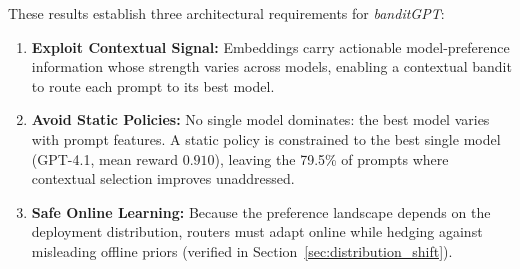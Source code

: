 

These results establish three architectural requirements for \textit{banditGPT}:
\begin{enumerate}[noitemsep,topsep=2pt,leftmargin=*]
    \item \textbf{Exploit Contextual Signal:} Embeddings carry actionable model-preference information whose strength varies across models, enabling a contextual bandit to route each prompt to its best model.
    \item \textbf{Avoid Static Policies:} No single model dominates: the best model varies with prompt features. A static policy is constrained to the best single model (GPT-4.1, mean reward $0.910$), leaving the 79.5\% of prompts where contextual selection improves unaddressed.
    \item \textbf{Safe Online Learning:} Because the preference landscape depends on the deployment distribution, routers must adapt online while hedging against misleading offline priors (verified in Section~\ref{sec:distribution_shift}).
\end{enumerate}


